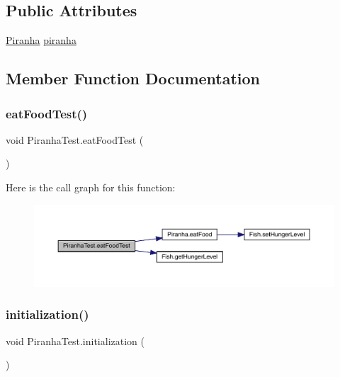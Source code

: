 \subsection*{Public Attributes}
\begin{DoxyCompactItemize}
\item 
\mbox{\hyperlink{class_piranha}{Piranha}} \mbox{\hyperlink{class_piranha_test_a77b3ec64ac02dc0762b1106fe4ccd4aa}{piranha}}
\end{DoxyCompactItemize}


\subsection{Member Function Documentation}
\mbox{\label{class_piranha_test_abfa9df41081adff1ecbc0fa3dd433ce8}} 
\subsubsection{\texorpdfstring{eat\+Food\+Test()}{eatFoodTest()}}
{\footnotesize\ttfamily void Piranha\+Test.\+eat\+Food\+Test (\begin{DoxyParamCaption}{ }\end{DoxyParamCaption})\hspace{0.3cm}{\ttfamily [inline]}}

Here is the call graph for this function\+:
\nopagebreak
\begin{figure}[H]
\begin{center}
\leavevmode
\includegraphics[width=350pt]{class_piranha_test_abfa9df41081adff1ecbc0fa3dd433ce8_cgraph}
\end{center}
\end{figure}
\mbox{\label{class_piranha_test_aa4e18322fef9deccb3fca9ca40ebb340}} 
\subsubsection{\texorpdfstring{initialization()}{initialization()}}
{\footnotesize\ttfamily void Piranha\+Test.\+initialization (\begin{DoxyParamCaption}{ }\end{DoxyParamCaption})\hspace{0.3cm}{\ttfamily [inline]}}



